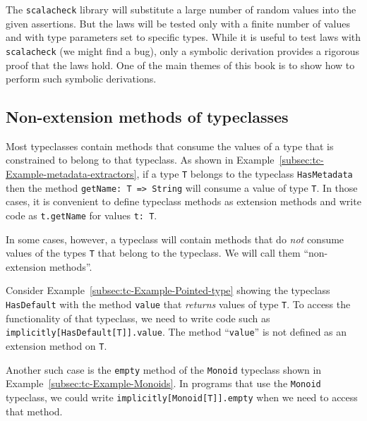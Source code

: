 The \texttt{scalacheck} library will substitute a large number of
random values into the given assertions. But the laws will be tested
only with a finite number of values and with type parameters set to
specific types. While it is useful to test laws with \texttt{scalacheck}
(we might find a bug), only a symbolic derivation provides a rigorous
proof that the laws hold. One of the main themes of this book is to
show how to perform such symbolic derivations.

\subsection{Non-extension methods of typeclasses}

Most typeclasses contain methods that consume the values of a type
that is constrained to belong to that typeclass. As shown in Example~\ref{subsec:tc-Example-metadata-extractors},
if a type \lstinline!T! belongs to the typeclass \lstinline!HasMetadata!
then the method \lstinline!getName: T => String! will consume a value
of type \lstinline!T!. In those cases, it is convenient to define
typeclass methods as extension methods and write code as \lstinline!t.getName!
for values \lstinline!t: T!.

In some cases, however, a typeclass will contain methods that do \emph{not}
consume values of the types \lstinline!T! that belong to the typeclass.
We will call them \textsf{``}non-extension methods\textsf{''}.

Consider Example~\ref{subsec:tc-Example-Pointed-type} showing the
typeclass \lstinline!HasDefault! with the method \lstinline!value!
that \emph{returns} values of type \lstinline!T!. To access the functionality
of that typeclass, we need to write code such as \lstinline!implicitly[HasDefault[T]].value!.
The method \textsf{``}\lstinline!value!\textsf{''} is not defined as an extension
method on \lstinline!T!.

Another such case is the \lstinline!empty! method of the \lstinline!Monoid!
typeclass shown in Example~\ref{subsec:tc-Example-Monoids}. In programs
that use the \lstinline!Monoid! typeclass, we could write \lstinline!implicitly[Monoid[T]].empty!
when we need to access that method.

